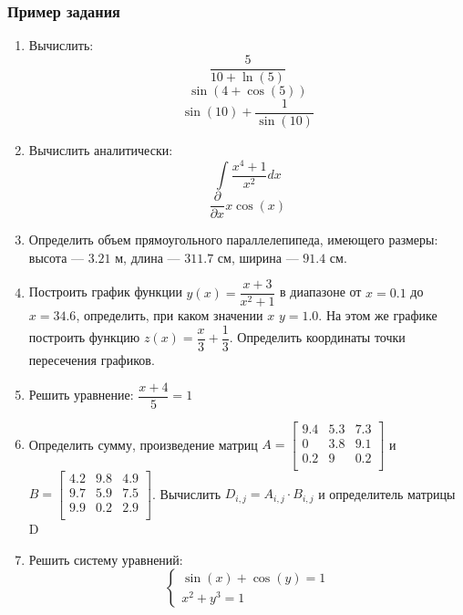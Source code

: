 \subsubsection*{Пример задания}
\begin{enumerate}
	\item Вычислить: 
	\begin{equation*}\dfrac{5}{10+\ln(5)}              \end{equation*}
	\begin{equation*}\sin(4+\cos(5))                   \end{equation*}
	\begin{equation*}\sin(10)+\dfrac{1}{\sin(10)}      \end{equation*}
	
	\item Вычислить аналитически: 
	\begin{equation*} \int \dfrac{x^4+1}{x^2} dx                \end{equation*}\begin{equation*} \dfrac{\partial} {\partial x} x\cos(x)              \end{equation*}
	
	
	\item Определить объем прямоугольного параллелепипеда, имеющего размеры: высота --- $3.21$ м, длина --- $311.7$ см, ширина --- $91.4$ см.
	
	\item Построить график функции $y(x)=\dfrac{x+3}{x^2+1}    $ в диапазоне от $x=0.1$ до $x=34.6$, определить, при каком значении $x$ $y=1.0$. На этом же графике построить функцию $z(x)=\dfrac{x}{3}+\dfrac{1}{3} $. Определить координаты точки пересечения графиков. \item Решить уравнение: $\dfrac{x+4}{5}=1     $
	
	\item Определить сумму, произведение матриц $A=\begin{bmatrix}
	9.4 &5.3 &7.3 \\
	0 &3.8 &9.1 \\
	0.2 &9 &0.2 \\
	\end{bmatrix}
	$ и $B=\begin{bmatrix}
	4.2 &9.8 &4.9 \\
	9.7 &5.9 &7.5 \\
	9.9 &0.2 &2.9 \\
	\end{bmatrix}
	$. Вычислить $D_{i,j}=A_{i,j}  \cdot  B_{i,j}$ и определитель матрицы D
	
	\item Решить систему уравнений: \begin{equation*} \begin{cases} \sin(x)+\cos(y)=1    \\ x^2 + y^3=1               \end{cases} \end{equation*} 
\end{enumerate}

